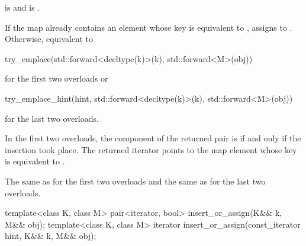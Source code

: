 \begin{itemdescr}
\pnum
\constraints
{} is  and
 is .

\pnum
\effects
If the map already contains an element 
whose key is equivalent to ,
assigns  to .
Otherwise, equivalent to
\begin{codeblock}
try_emplace(std::forward<decltype(k)>(k), std::forward<M>(obj))
\end{codeblock}
for the first two overloads or
\begin{codeblock}
try_emplace_hint(hint, std::forward<decltype(k)>(k), std::forward<M>(obj))
\end{codeblock}
for the last two overloads.

\pnum
\returns
In the first two overloads, the  component of the returned pair
is  if and only if the insertion took place.  The returned
iterator points to the map element whose key is equivalent to .

\pnum
\complexity
The same as  for the first two overloads and
the same as  for the last two overloads.
\end{itemdescr}

%
\begin{itemdecl}
template<class K, class M>
  pair<iterator, bool> insert_or_assign(K&& k, M&& obj);
template<class K, class M>
  iterator insert_or_assign(const_iterator hint, K&& k, M&& obj);
\end{itemdecl}

